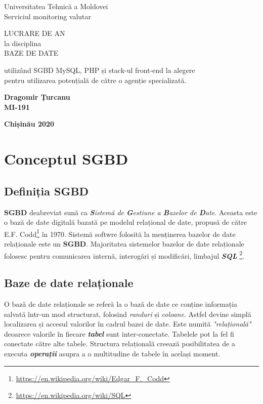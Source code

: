 \documentclass[12pt. a4paper]{report}
\begin{document}
\begin{titlepage}
\newlength{\drop}

\textheight
\vspace*{\drop}
\centering
{\LARGE Universitatea Tehnică a Moldovei}\\[2\baselineskip]
{\LARGE\sffamily Serviciul monitoring valutar}\par
\vfill
{\LARGE LUCRARE DE AN\\
\small la disciplina \\
\large BAZE DE DATE}\par
\vspace{\drop}
{\large utilizând SGBD MySQL, PHP și stack-ul front-end la alegere \\
pentru utilizarea potențială de către o agenție specializată.}\par
\vfill
{\large\bfseries Dragomir Țurcanu\\
\small MI-191}\par
\vspace*{\drop}
{\large\bfseries Chișinău 2020}\par

\end{titlepage}



\tableofcontents

\chapter{Conceptul SGBD}

\section{Definiția SGBD}
\textbf{SGBD} deabreviat sună ca \emph{\textbf{S}istemă de \textbf{G}estiune a \textbf{B}azelor de \textbf{D}ate}. Aceasta este o bază de date digitală bazată pe modelul relațional de date, propusă de către E.F. Codd\footnote{\url{https://en.wikipedia.org/wiki/Edgar_F._Codd}} în 1970. Sistemă softwre folosită la menținerea bazelor de date relaționale este un \textbf{SGBD}. Majoritatea sistemelor bazelor de date relaționale folosesc pentru comunicarea internă, interogări și modificări, limbajul \emph{\textbf{SQL}} \footnote{\url{https://en.wikipedia.org/wiki/SQL}}.

\section{Baze de date relaționale}
O bază de date relaționale se referă la o bază de date ce conține informația salvată într-un mod structurat, folosind \emph{randuri} și \emph{coloane}. Astfel devine simplă localizarea și accesul valorilor în cadrul bazei de date. Este numită \emph{"relațională"} deoarece valorile în fiecare \emph{\textbf{tabel}} sunt inter-conectate. Tabelele pot la fel fi conectate către alte tabele. Structura relațională creează posibilitatea de a executa \emph{\textbf{operații}} asupra a o multitudine de tabele în același moment.
\end{document}
